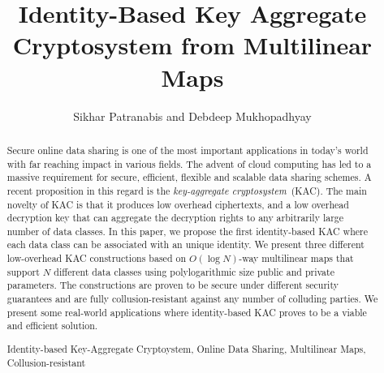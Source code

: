 \documentclass{class/llncs}
\title{Identity-Based Key Aggregate Cryptosystem from Multilinear Maps}
\begin{document}
% 

\author{Sikhar Patranabis and Debdeep Mukhopadhyay}
\maketitle
{}


\begin{abstract}

Secure online data sharing is one of the most important applications in today's world with far reaching impact in various fields. The advent of cloud computing has led to a massive requirement for secure, efficient, flexible and scalable data sharing schemes. A recent proposition in this regard is the \emph{key-aggregate cryptosystem}~(KAC). The main novelty of KAC is that it produces low overhead ciphertexts, and a low overhead decryption key that can aggregate the decryption rights to any arbitrarily large number of data classes. In this paper, we propose the first identity-based KAC where each data class can be associated with an unique identity. We present three different low-overhead KAC constructions based on $O(\log N)$-way multilinear maps that support $N$ different data classes using polylogarithmic size public and private parameters. The constructions are proven to be secure under different security guarantees and are fully collusion-resistant against any number of colluding parties. We present some real-world applications where identity-based KAC proves to be a viable and efficient solution.    

 Identity-based Key-Aggregate Cryptoystem, Online Data Sharing, Multilinear Maps, Collusion-resistant
\end{abstract}












\newpage

\end{document}
